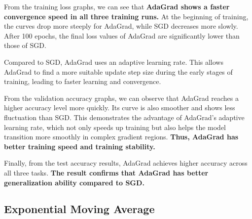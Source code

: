 \documentclass[12pt]{article}
\begin{document}
From the training loss graphs, we can see that \textbf{AdaGrad shows a faster convergence speed in all three training runs.} At the beginning of training, the curves drop more steeply for AdaGrad, while SGD decreases more slowly. After 100 epochs, the final loss values of AdaGrad are significantly lower than those of SGD.

Compared to SGD, AdaGrad uses an adaptive learning rate. This allows AdaGrad to find a more suitable update step size during the early stages of training, leading to faster learning and convergence.

From the validation accuracy graphs, we can observe that AdaGrad reaches a higher accuracy level more quickly. Its curve is also smoother and shows less fluctuation than SGD. This demonstrates the advantage of AdaGrad’s adaptive learning rate, which not only speeds up training but also helps the model transition more smoothly in complex gradient regions. \textbf{Thus, AdaGrad has better training speed and training stability.}

Finally, from the test accuracy results, AdaGrad achieves higher accuracy across all three tasks. \textbf{The result confirms that AdaGrad has better generalization ability compared to SGD.}




\subsection{Exponential Moving Average}
\end{document}
